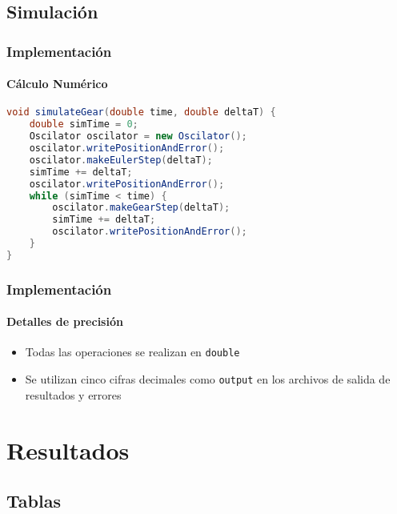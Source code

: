 \documentclass[hyperref={pdfpagelayout=SinglePage}]{beamer}
\begin{document}
\subsection{Simulación}

\begin{frame}[fragile]
\frametitle{Implementación}
\framesubtitle{Cálculo Numérico}
\begin{lstlisting}[language=Java, caption = Método de Gear Predictor Corrector]
void simulateGear(double time, double deltaT) {
	double simTime = 0;
    Oscilator oscilator = new Oscilator();
	oscilator.writePositionAndError();
    oscilator.makeEulerStep(deltaT);
    simTime += deltaT;
	oscilator.writePositionAndError();
    while (simTime < time) {
    	oscilator.makeGearStep(deltaT);
        simTime += deltaT;
		oscilator.writePositionAndError();
    }
}
\end{lstlisting}
\end{frame}

\begin{frame}
\frametitle{Implementación}
\framesubtitle{Detalles de precisión}
\begin{itemize}
	\item Todas las operaciones se realizan en \texttt{double}
	\item Se utilizan cinco cifras decimales como \texttt{output} en los archivos de salida de resultados y errores
\end{itemize}
\end{frame}

\section{Resultados}

\subsection{Tablas}
\end{document}
